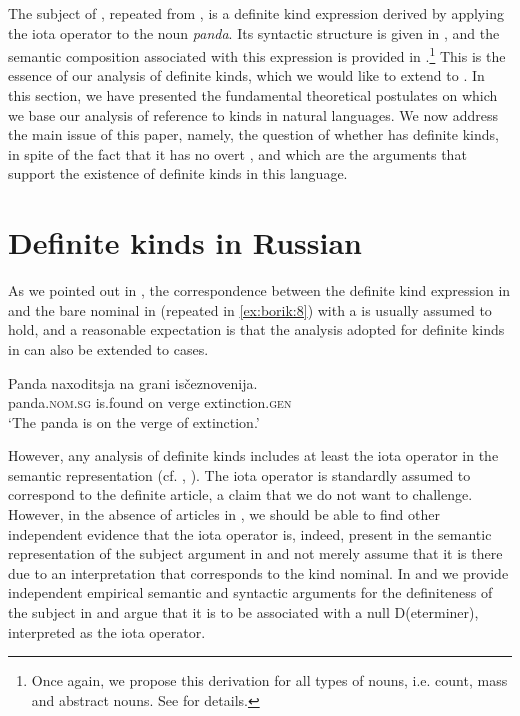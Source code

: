 \documentclass[output=paper
,modfonts
,nonflat]{langsci/langscibook}
\begin{document}
	The subject of , repeated from , is a definite kind expression derived by applying the iota operator to the noun \textit{panda}. Its syntactic structure is given in , and the semantic composition associated with this expression is provided in .\footnote{Once again, we propose this derivation for all types of nouns, i.e. count, mass and abstract nouns. See \citet{Borik2015} for details.} This is the essence of our analysis of definite kinds, which we would like to extend to . 
	In this section, we have presented the fundamental theoretical postulates on which we base our analysis of reference to kinds in natural languages. We now address the main issue of this paper, namely, the question of whether  has definite kinds, in spite of the fact that it has no overt , and which are the arguments that support the existence of definite kinds in this language. 
	
	\section{Definite kinds in Russian} \label{sec:borik:3}
	
	As we pointed out in , the correspondence between the  definite kind expression in  and the  bare nominal in  (repeated in \ref{ex:borik:8}) with a  is usually assumed to hold, and a reasonable expectation is that the analysis adopted for definite kinds in  can also be extended to  cases. 
	
	\ea\label{ex:borik:8}
	\gll Panda naxoditsja		na		grani		is\v{c}eznovenija. \\
	panda.\textsc{nom.sg} 	is.found 			on		verge		extinction.\textsc{gen}\\
	\glt `The panda is on the verge of extinction.'
	\z
	
	However, any analysis of  definite kinds includes at least the iota operator in the semantic representation (cf. \citealt{Chierchia1998}, \citealt{Dayal2004}). The iota operator is standardly assumed to correspond to the definite article, a claim that we do not want to challenge. However, in the absence of articles in , we should be able to find other independent evidence that the iota operator is, indeed, present in the semantic representation of the subject argument in  and not merely assume that it is there due to an interpretation that corresponds to the  kind nominal. In  and  we provide independent empirical semantic and syntactic arguments for the definiteness of the subject in  and argue that it is to be associated with a null D(eterminer), interpreted as the iota operator. 
	
\end{document}
